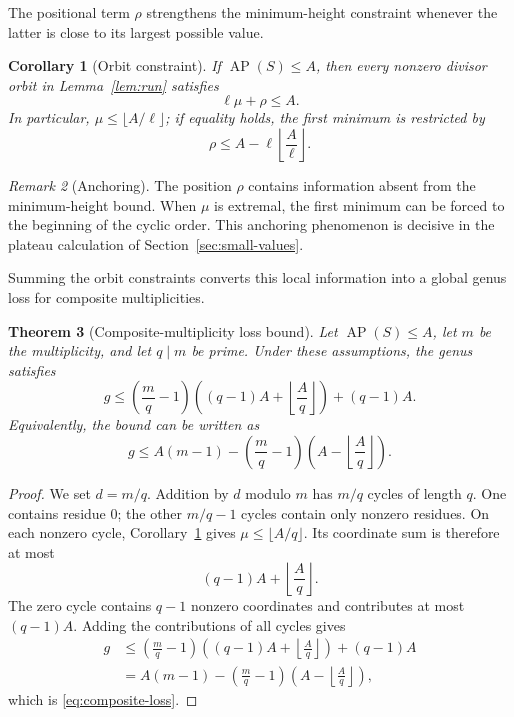 \documentclass[11pt]{article}
\theoremstyle{plain}
\newtheorem{theorem}{Theorem}[section]
\newtheorem{corollary}[theorem]{Corollary}
\theoremstyle{definition}
\theoremstyle{remark}
\newtheorem{remark}[theorem]{Remark}
\newcommand{\AP}{\operatorname{AP}}
\begin{document}
The positional term $\rho$ strengthens the minimum-height constraint whenever
the latter is close to its largest possible value.

\begin{corollary}[Orbit constraint]\label{cor:orbit-constraint}
If $\AP(S)\leq A$, then every nonzero divisor orbit in
Lemma~\ref{lem:run} satisfies
\[
  \boxed{\ell\mu+\rho\leq A.}
\]
In particular, $\mu\leq\lfloor A/\ell\rfloor$; if equality holds, the first
minimum is restricted by
\[
  \rho\leq A-\ell\left\lfloor\frac A\ell\right\rfloor.
\]
\end{corollary}

\begin{remark}[Anchoring]
The position $\rho$ contains information absent from the minimum-height bound.
When $\mu$ is extremal, the first minimum can be forced to the beginning of
the cyclic order.  This anchoring phenomenon is decisive in the plateau
calculation of Section~\ref{sec:small-values}.
\end{remark}

Summing the orbit constraints converts this local information into a global
genus loss for composite multiplicities.

\begin{theorem}[Composite-multiplicity loss bound]
\label{thm:composite-loss}
Let $\AP(S)\leq A$, let $m$ be the multiplicity, and let $q\mid m$ be prime.
Under these assumptions, the genus satisfies
\[
  \boxed{g\leq
  \left(\frac mq-1\right)
  \left((q-1)A+\left\lfloor\frac Aq\right\rfloor\right)
  +(q-1)A.}
\]
Equivalently, the bound can be written as
\begin{equation}\label{eq:composite-loss}
  \boxed{g\leq A(m-1)-\left(\frac mq-1\right)
  \left(A-\left\lfloor\frac Aq\right\rfloor\right).}
\end{equation}
\end{theorem}

\begin{proof}
We set $d=m/q$.  Addition by $d$ modulo $m$ has $m/q$ cycles of length $q$.
One contains residue $0$; the other $m/q-1$ cycles contain only nonzero
residues.  On each nonzero cycle, Corollary~\ref{cor:orbit-constraint} gives
$\mu\leq\lfloor A/q\rfloor$.  Its coordinate sum is therefore at most
\[
  (q-1)A+\left\lfloor\frac Aq\right\rfloor.
\]
The zero cycle contains $q-1$ nonzero coordinates and contributes at most
$(q-1)A$.  Adding the contributions of all cycles gives
\[
\begin{aligned}
g
&\leq
\left(\frac mq-1\right)
\left((q-1)A+\left\lfloor\frac Aq\right\rfloor\right)
+(q-1)A\\
&=A(m-1)-\left(\frac mq-1\right)
\left(A-\left\lfloor\frac Aq\right\rfloor\right),
\end{aligned}
\]
which is \eqref{eq:composite-loss}.
\end{proof}
\end{document}
